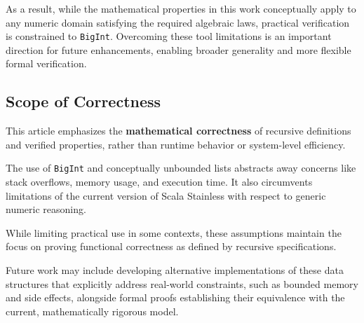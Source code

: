 As a result, while the mathematical properties in this work conceptually
apply to any numeric domain satisfying the required algebraic laws,
practical verification is constrained to \texttt{BigInt}. Overcoming
these tool limitations is an important direction for future
enhancements, enabling broader generality and more flexible formal
verification.

\subsection{Scope of Correctness}

This article emphasizes the \textbf{mathematical correctness} of
recursive definitions and verified properties, rather than runtime
behavior or system-level efficiency.

The use of \texttt{BigInt} and conceptually unbounded lists abstracts
away concerns like stack overflows, memory usage, and execution time. It
also circumvents limitations of the current version of Scala Stainless
with respect to generic numeric reasoning.

While limiting practical use in some contexts, these assumptions
maintain the focus on proving functional correctness as defined by
recursive specifications.

Future work may include developing alternative implementations of these
data structures that explicitly address real-world constraints, such as
bounded memory and side effects, alongside formal proofs establishing
their equivalence with the current, mathematically rigorous model.
